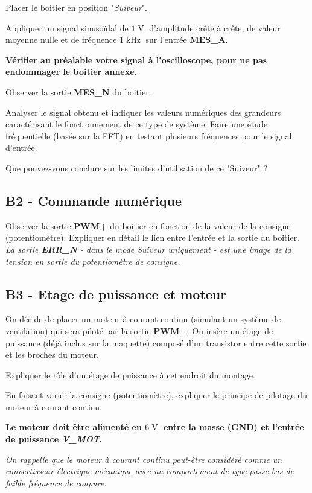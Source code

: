 \documentclass[a4paper,11pt]{article}
\begin{document}
\Real Placer le boitier en position "\textit{Suiveur}".

\Real Appliquer un signal sinusoïdal de $1\operatorname{V}$ d'amplitude crête à crête, de valeur moyenne nulle et de fréquence $1\operatorname{kHz}$ sur l'entrée \textbf{\textsc{MES\_A}}. 

\textbf{Vérifier au préalable votre signal à l'oscilloscope, pour ne pas endommager le boitier annexe.}

\Real Observer la sortie \textbf{\textsc{MES\_N}} du boitier. 

\Real Analyser le signal obtenu et indiquer les valeurs numériques des grandeurs caractérisant le fonctionnement de ce type de système. Faire une étude fréquentielle (basée sur la FFT) en testant plusieurs fréquences pour le signal d'entrée. 

\Real Que pouvez-vous conclure sur les limites d'utilisation de ce "Suiveur" ?


\subsection*{B2 - Commande numérique}


\Real Observer la sortie \textbf{\textsc{PWM+}} du boitier en fonction de la valeur de la consigne (potentiomètre). Expliquer en détail le lien entre l'entrée et la sortie du boitier. \textit{La sortie \textbf{\textsc{ERR\_N}} - dans le mode Suiveur uniquement - est une image de la tension en sortie du potentiomètre de consigne.}


\subsection*{B3 - Etage de puissance et moteur}

On décide de placer un moteur à courant continu (simulant un système de ventilation) qui sera piloté par la sortie \textbf{\textsc{PWM+}}. On insère un étage de puissance (déjà inclus sur la maquette) composé d'un transistor entre cette sortie et les broches du moteur.

\Real Expliquer le rôle d'un étage de puissance à cet endroit du montage.

\Real En faisant varier la consigne (potentiomètre), expliquer le principe de pilotage du moteur à courant continu.

\textbf{Le moteur doit être alimenté en  $6\operatorname{V}$ entre la masse (GND) et l'entrée de puissance  \textit{V\_MOT}.}

\textit{On rappelle que le moteur à courant continu peut-être considéré comme un convertisseur électrique-mécanique avec un comportement de type passe-bas de faible fréquence de coupure.}
\end{document}
